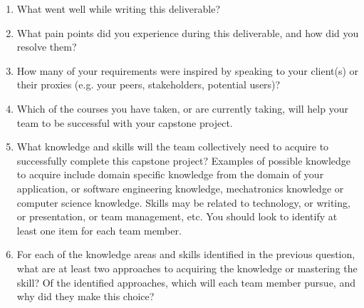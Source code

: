 \documentclass[12pt]{article}
\begin{document}


\begin{enumerate}
  \item What went well while writing this deliverable? 
  \item What pain points did you experience during this deliverable, and how did
  you resolve them?
  \item How many of your requirements were inspired by speaking to your
  client(s) or their proxies (e.g. your peers, stakeholders, potential users)?
  \item Which of the courses you have taken, or are currently taking, will help
  your team to be successful with your capstone project.
  \item What knowledge and skills will the team collectively need to acquire to
  successfully complete this capstone project?  Examples of possible knowledge
  to acquire include domain specific knowledge from the domain of your
  application, or software engineering knowledge, mechatronics knowledge or
  computer science knowledge.  Skills may be related to technology, or writing,
  or presentation, or team management, etc.  You should look to identify at
  least one item for each team member.
  \item For each of the knowledge areas and skills identified in the previous
  question, what are at least two approaches to acquiring the knowledge or
  mastering the skill?  Of the identified approaches, which will each team
  member pursue, and why did they make this choice?
\end{enumerate}
\end{document}
